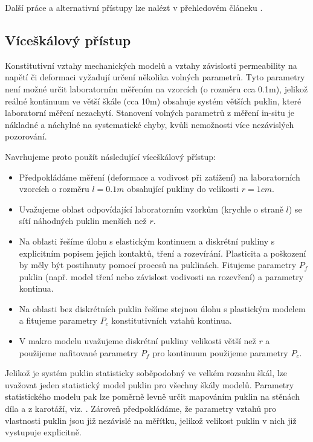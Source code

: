 \documentclass{article}
\begin{document}
Další práce a alternativní přístupy lze nalézt v přehledovém článeku \cite{Shahbazi2020a}. 




\subsection{Víceškálový přístup}
\label{sec:mikroskala}
Konstitutivní vztahy mechanických modelů a vztahy závislosti permeability na napětí či deformaci vyžadují určení 
několika volných parametrů. Tyto parametry není možné určit laboratorním měřením na vzorcích (o rozměru cca 0.1m), 
jelikož reálné kontinuum ve větší škále (cca 10m) obsahuje systém větších puklin, které laboratorní měření nezachytí. 
Stanovení volných parametrů z měření in-situ je nákladné a náchylné na systematické chyby, kvůli nemožnosti 
více nezávislých pozorování. 


Navrhujeme proto použít následující víceškálový přístup:
\begin{itemize}
 \item Předpokládáme měření (deformace a vodivost při zatížení) na laboratorních vzorcích o rozměru $l=0.1m$ obsahující pukliny do velikosti $r=1cm$.
 \item Uvažujeme oblast odpovídající laboratorním vzorkům (krychle o straně $l$) se sítí náhodných puklin menších než $r$.
 \item Na oblasti řešíme úlohu s elastickým kontinuem a diskrétní pukliny s explicitním popisem jejich kontaktů, tření a rozevírání.
       Plasticita a poškození by měly být postihnuty pomocí procesů na puklinách. Fitujeme parametry $P_f$ puklin (např. model tření nebo závislost vodivosti na rozevření) a parametry kontinua. 
 \item Na oblasti bez diskrétních puklin řešíme stejnou úlohu s plastickým modelem a fitujeme parametry $P_c$ konstitutivních vztahů kontinua.
 \item V makro modelu uvažujeme diskrétní pukliny velikosti větší než $r$ a použijeme nafitované parametry $P_f$ pro kontinuum použijeme parametry $P_c$.
\end{itemize}
Jelikož je systém puklin statisticky soběpodobný ve velkém rozsahu škál, lze uvažovat jeden statistický model puklin pro všechny škály modelů.
Parametry statistického modelu pak lze poměrně levně určit mapováním puklin na stěnách díla a z karotáží, viz. \cite{Bonnet2001}.
Zároveň předpokládáme, že parametry vztahů pro vlastnosti puklin jsou již nezávislé na měřítku, 
jelikož velikost puklin v nich již vystupuje explicitně. 
\end{document}
